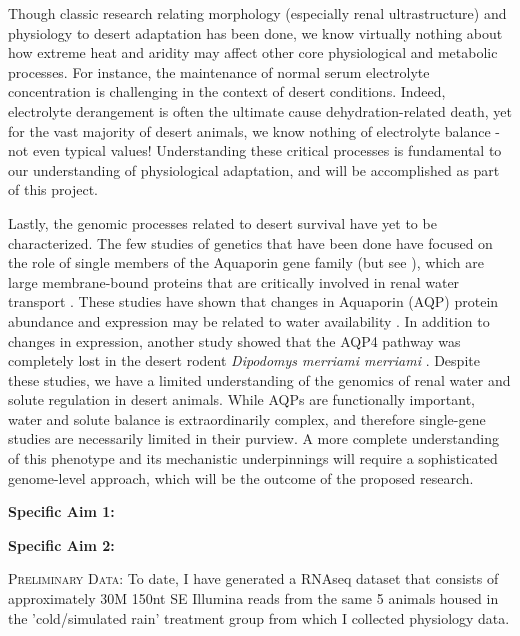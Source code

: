 \documentclass[11pt]{article}
\begin{document}
Though classic research relating morphology (especially renal ultrastructure) and physiology to desert adaptation has been done, we know virtually nothing about how extreme heat and aridity may affect other core physiological and metabolic processes. For instance, the maintenance of normal serum electrolyte concentration is challenging in the context of desert conditions. Indeed, electrolyte derangement is often the ultimate cause dehydration-related death, yet for the vast majority of desert animals, we know nothing of electrolyte balance - not even typical values! Understanding these critical processes is fundamental to our understanding of physiological adaptation, and will be accomplished as part of this project. 

Lastly, the genomic processes related to desert survival have yet to be characterized. The few studies of genetics that have been done have focused on the role of single members of the Aquaporin gene family (but see \cite{Bartolo:2007hy}), which are large membrane-bound proteins that are critically involved in renal water transport \citep{Kwon:2009bv,Verkman:2002ww,Brown:1995vo,Nielsen:1995cb}. These studies have shown that changes in Aquaporin (AQP) protein abundance and expression may be related to water availability \citep{Boselt:2009fb, Gallardo:2005fm,Bozinovic:2003eg}. In addition to changes in expression, another study showed that the AQP4 pathway was completely lost in the desert rodent \textit{Dipodomys merriami merriami} \citep{Huang:2001ti}. Despite these studies, we have a limited understanding of the genomics of renal water and solute regulation in desert animals. While AQPs are functionally important, water and solute balance is extraordinarily complex, and therefore single-gene studies are necessarily limited in their purview. A more complete understanding of this phenotype and its mechanistic underpinnings will require a sophisticated genome-level approach, which will be the outcome of the proposed research. 


\textbf{Specific Aim 1:}   

\textbf{Specific Aim 2:}  

\textsc{{Preliminary Data:}} To date, I have generated a RNAseq dataset that consists of approximately 30M 150nt SE Illumina reads from the same 5 animals housed in the 'cold/simulated rain' treatment group from which I collected physiology data. 
\end{document}
